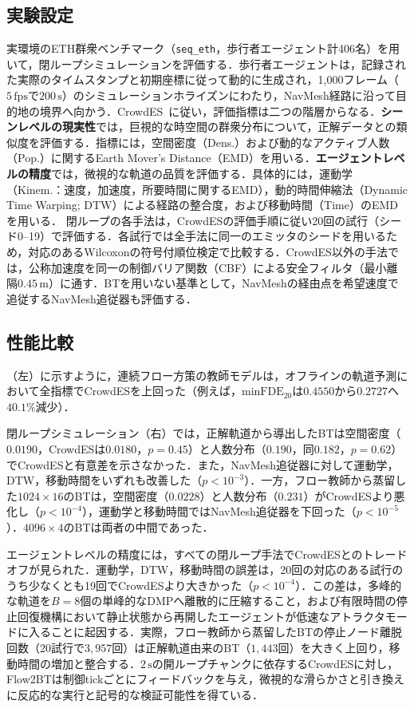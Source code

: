 \documentclass{sice-si}
\begin{document}
\subsection{実験設定}
実環境のETH群衆ベンチマーク（\texttt{seq\_eth}，歩行者エージェント計406名）\cite{bae2025crowdes}を用いて，閉ループシミュレーションを評価する．歩行者エージェントは，記録された実際のタイムスタンプと初期座標に従って動的に生成され，1,000フレーム（$5\,\text{fps}$で$200\,\text{s}$）のシミュレーションホライズンにわたり，NavMesh経路に沿って目的地の境界へ向かう．CrowdES~\cite{bae2025crowdes}に従い，評価指標は二つの階層からなる．\textbf{シーンレベルの現実性}では，巨視的な時空間の群衆分布について，正解データとの類似度を評価する．指標には，空間密度（Dens.）および動的なアクティブ人数（Pop.）に関するEarth Mover's Distance（EMD）を用いる．\textbf{エージェントレベルの精度}では，微視的な軌道の品質を評価する．具体的には，運動学（Kinem.：速度，加速度，所要時間に関するEMD），動的時間伸縮法（Dynamic Time Warping; DTW）による経路の整合度，および移動時間（Time）のEMDを用いる．
閉ループの各手法は，CrowdESの評価手順に従い20回の試行（シード0--19）で評価する．各試行では全手法に同一のエミッタのシードを用いるため，対応のあるWilcoxonの符号付順位検定で比較する．CrowdES以外の手法では，公称加速度を同一の制御バリア関数（CBF）による安全フィルタ（最小離隔$0.45\,\text{m}$）に通す．BTを用いない基準として，NavMeshの経由点を希望速度で追従するNavMesh追従器も評価する．

\subsection{性能比較}
（左）に示すように，連続フロー方策の教師モデルは，オフラインの軌道予測において全指標でCrowdESを上回った（例えば，$\text{minFDE}_{20}$は$0.4550$から$0.2727$へ$40.1\%$減少）．

閉ループシミュレーション（右）では，正解軌道から導出したBTは空間密度（$0.0190$，CrowdESは$0.0180$，$p = 0.45$）と人数分布（$0.190$，同$0.182$，$p = 0.62$）でCrowdESと有意差を示さなかった．また，NavMesh追従器に対して運動学，DTW，移動時間をいずれも改善した（$p < 10^{-3}$）．一方，フロー教師から蒸留した$1024 \times 16$のBTは，空間密度（$0.0228$）と人数分布（$0.231$）がCrowdESより悪化し（$p < 10^{-4}$），運動学と移動時間ではNavMesh追従器を下回った（$p < 10^{-5}$）．$4096 \times 4$のBTは両者の中間であった．

エージェントレベルの精度には，すべての閉ループ手法でCrowdESとのトレードオフが見られた．運動学，DTW，移動時間の誤差は，20回の対応のある試行のうち少なくとも19回でCrowdESより大きかった（$p < 10^{-4}$）．この差は，多峰的な軌道を$B=8$個の単峰的なDMPへ離散的に圧縮すること，および有限時間の停止回復機構において静止状態から再開したエージェントが低速なアトラクタモードに入ることに起因する．実際，フロー教師から蒸留したBTの停止ノード離脱回数（20試行で$3{,}957$回）は正解軌道由来のBT（$1{,}443$回）を大きく上回り，移動時間の増加と整合する．$2\,\text{s}$の開ループチャンクに依存するCrowdESに対し，Flow2BTは制御tickごとにフィードバックを与え，微視的な滑らかさと引き換えに反応的な実行と記号的な検証可能性を得ている．
\end{document}

